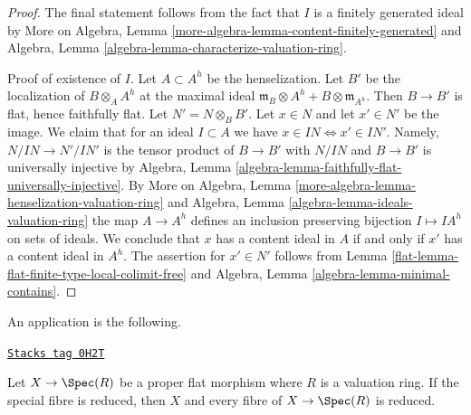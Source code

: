 \begin{proof}

The final statement follows from the fact that $I$ is a finitely
generated ideal by
More on Algebra, Lemma \ref{more-algebra-lemma-content-finitely-generated}
and Algebra, Lemma \ref{algebra-lemma-characterize-valuation-ring}.

\medskip\noindent
Proof of existence of $I$.
Let $A \subset A^h$ be the henselization. Let $B'$ be the localization
of $B \otimes_A A^h$ at the maximal ideal
$\mathfrak m_B \otimes A^h + B \otimes \mathfrak m_{A^h}$.
Then $B \to B'$ is flat, hence faithfully flat.
Let $N' = N \otimes_B B'$.
Let $x \in N$ and let $x' \in N'$ be the image.
We claim that for an ideal $I \subset A$ we have
$x \in IN \Leftrightarrow x' \in IN'$.
Namely, $N/IN \to N'/IN'$ is the tensor product of $B \to B'$
with $N/IN$ and $B \to B'$ is universally injective by
Algebra, Lemma \ref{algebra-lemma-faithfully-flat-universally-injective}.
By More on Algebra, Lemma \ref{more-algebra-lemma-henselization-valuation-ring}
and Algebra, Lemma \ref{algebra-lemma-ideals-valuation-ring}
the map $A \to A^h$ defines an inclusion preserving
bijection $I \mapsto IA^h$ on sets of ideals. We conclude that
$x$ has a content ideal in $A$ if and only if $x'$ has a content
ideal in $A^h$. The assertion for $x' \in N'$ follows from
Lemma \ref{flat-lemma-flat-finite-type-local-colimit-free} and
Algebra, Lemma \ref{algebra-lemma-minimal-contains}.
\end{proof}

An application is the following.

\begin{lemma}
\label{flat-lemma-proper-flat-over-dvr-reduced-fibre}
\href{https://stacks.math.columbia.edu/tag/0H2T}{\texttt{Stacks tag 0H2T}}

Let $X \to \Spec(R)$ be a proper flat morphism where $R$ is a valuation ring.
If the special fibre is reduced, then $X$ and every fibre of $X \to \Spec(R)$
is reduced.
\end{lemma}

